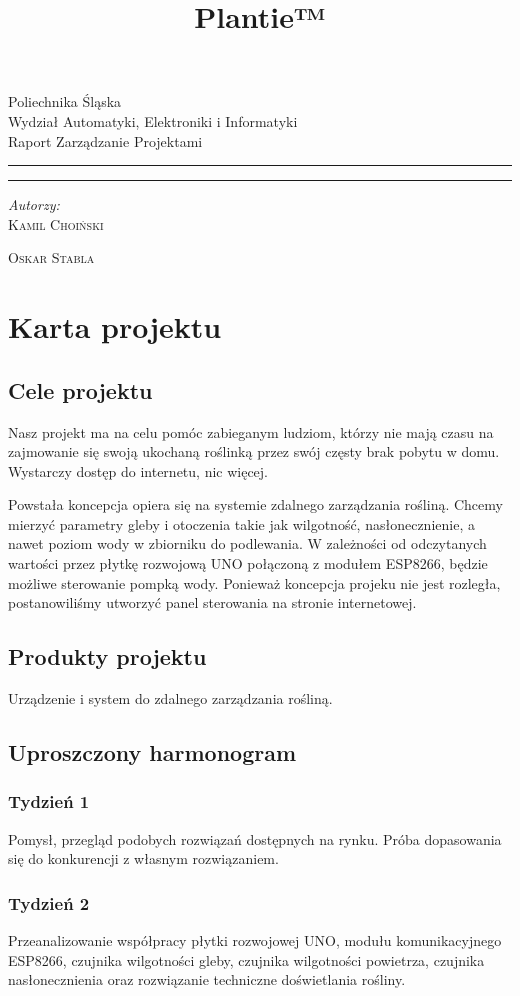 \documentclass[12pt]{article}
\title{Plantie™}
\makeatletter
\newcommand{\linia}{\rule{\linewidth}{0.4mm}}
\renewcommand{\maketitle}{\begin{titlepage}
		\vspace*{1cm}
		\begin{center}\small
			Poliechnika Śląska\\
			Wydział Automatyki, Elektroniki i Informatyki\\
			Raport Zarządzanie Projektami
		\end{center}
		\vspace{3cm}
		\noindent\linia
		\begin{center}
			\LARGE \textsc{\@title}
		\end{center}
		\linia
		\vspace{0.5cm}
		\begin{flushright}
			\begin{minipage}{15cm}
				\textit{\small Autorzy:}\\
				\normalsize \textsc{Kamil Choiński} \par \textsc{Oskar Stabla} \par
			\end{minipage}	
		\end{flushright}
		\vspace*{\stretch{6}}
		\begin{center}
			\@date
		\end{center}
	\end{titlepage}
}
\makeatother
\begin{document}
	
\maketitle

\tableofcontents


\section{Karta projektu}


\subsection{Cele projektu}
Nasz projekt ma na celu pomóc zabieganym ludziom, którzy nie mają czasu na zajmowanie się
swoją ukochaną roślinką przez swój częsty brak pobytu w domu. Wystarczy dostęp do internetu,
nic więcej.

Powstała koncepcja opiera się na systemie zdalnego zarządzania rośliną. Chcemy mierzyć parametry
gleby i otoczenia takie jak wilgotność, nasłonecznienie, a nawet poziom wody w zbiorniku do podlewania. W zależności od odczytanych wartości przez
płytkę rozwojową UNO połączoną z modułem ESP8266, będzie możliwe sterowanie pompką wody. Ponieważ koncepcja projeku nie jest rozległa, postanowiliśmy utworzyć panel sterowania na stronie
internetowej.

\subsection{Produkty projektu}

Urządzenie i system do zdalnego zarządzania rośliną.



\subsection{Uproszczony harmonogram}


\subsubsection{Tydzień 1}
Pomysł, przegląd podobych rozwiązań dostępnych na rynku.
Próba dopasowania się do konkurencji z własnym rozwiązaniem.

\subsubsection{Tydzień 2}
Przeanalizowanie współpracy płytki rozwojowej UNO, modułu komunikacyjnego ESP8266, czujnika wilgotności gleby, czujnika wilgotności powietrza, czujnika nasłonecznienia oraz rozwiązanie techniczne doświetlania rośliny. 
\end{document}
